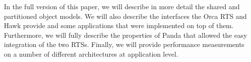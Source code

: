 \documentclass{article}
\begin{document}
In the full version of this paper, we will describe in more detail the
shared and partitioned object models. We will also describe the
interfaces the Orca RTS and Hawk provide and some applications that
were implemented on top of them. Furthermore, we will fully describe
the properties of Panda that allowed the easy integration of the two
RTSs. Finally, we will provide performance measurements on a number of
different architectures at application level.



\end{document}

